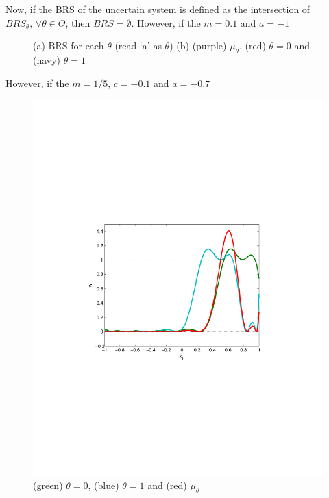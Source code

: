 \documentclass[10pt]{scrartcl}
\theoremstyle{remark}
\begin{document}
Now, if the BRS of the uncertain system is defined as the intersection of $BRS_\theta,\,\forall \theta\in \Theta$, then $BRS=\emptyset$.
\newpage
\clearpage
However, if the $m=0.1$ and $a=-1$
\begin{figure}[!ht]%
\centering
{}
\caption{(a) BRS for each $\theta$ (read `a' as $\theta$) (b) (purple) $\mu_\theta$, (red) $\theta=0$ and (navy) $\theta=1$}%
\end{figure}
\newpage
\clearpage
However, if the $m=1/5$, $c=-0.1$ and $a=-0.7$
\begin{figure}[!ht]%
\centering
\includegraphics[width=.5\columnwidth,trim= 1.5in 3.3in 1.5in 3.5in]{figures/1D_3}
\caption{(green) $\theta=0$, (blue) $\theta=1$ and (red) $\mu_\theta$}%
\end{figure}
\end{document}
